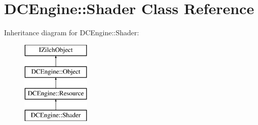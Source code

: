 \hypertarget{classDCEngine_1_1Shader}{\section{D\-C\-Engine\-:\-:Shader Class Reference}
\label{classDCEngine_1_1Shader}
}
Inheritance diagram for D\-C\-Engine\-:\-:Shader\-:\begin{figure}[H]
\begin{center}
\leavevmode
\includegraphics[height=4.000000cm]{classDCEngine_1_1Shader}
\end{center}
\end{figure}
